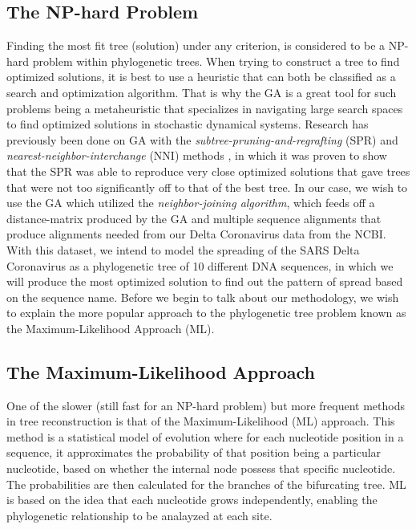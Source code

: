 \subsection{The NP-hard Problem}

Finding the most fit tree (solution) under any criterion, is considered to be a NP-hard problem within phylogenetic trees. When trying to construct a tree to find optimized solutions, it is best to use a heuristic that can both be classified as a search and optimization algorithm. That is why the GA is a great tool for such problems being a metaheuristic that specializes in navigating large search spaces to find optimized solutions in stochastic dynamical systems. Research has previously been done on GA with the \emph{subtree-pruning-and-regrafting} (SPR) and \emph{nearest-neighbor-interchange} (NNI) methods \cite{Money}, in which it was proven to show that the SPR was able to reproduce very close optimized solutions that gave trees that were not too significantly off to that of the best tree. In our case, we wish to use the GA which utilized the \emph{neighbor-joining algorithm}, which feeds off a distance-matrix produced by the GA and multiple sequence alignments that produce alignments needed from our Delta Coronavirus data from the NCBI. With this dataset, we intend to model the spreading of the SARS Delta Coronavirus as a phylogenetic tree of 10 different DNA sequences, in which we will produce the most optimized solution to find out the pattern of spread based on the sequence name. Before we begin to talk about our methodology, we wish to explain the more popular approach to the phylogenetic tree problem known as the Maximum-Likelihood Approach (ML). 

\subsection{The Maximum-Likelihood Approach}

One of the slower (still fast for an NP-hard problem) but more frequent methods in tree reconstruction is that of the Maximum-Likelihood (ML) approach. This method is a statistical model of evolution where for each nucleotide position in a sequence, it approximates the probability of that position being a particular nucleotide, based on whether the internal node possess that specific nucleotide. The probabilities are then calculated for the branches of the bifurcating tree. ML is based on the idea that each nucleotide grows independently, enabling the phylogenetic relationship to be analayzed at each site. 

